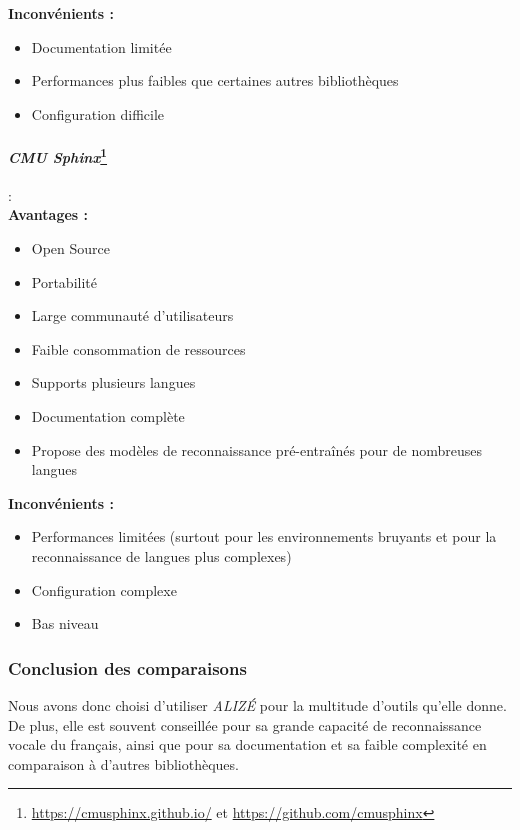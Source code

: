 \textbf{Inconvénients :}
\begin{itemize}
    \item Documentation limitée
    \item Performances plus faibles que certaines autres bibliothèques
    \item Configuration difficile
\end{itemize}

\paragraph*{\textbf{\textit{CMU Sphinx}}\footnote{\url{https://cmusphinx.github.io/} et \url{https://github.com/cmusphinx}}}: \\

\textbf{Avantages :}
\begin{itemize}
    \item Open Source
    \item Portabilité
    \item Large communauté d'utilisateurs
    \item Faible consommation de ressources
    \item Supports plusieurs langues
    \item Documentation complète
    \item Propose des modèles de reconnaissance pré-entraînés pour de nombreuses langues
\end{itemize}

\textbf{Inconvénients :}
\begin{itemize}
    \item Performances limitées (surtout pour les environnements bruyants et pour la reconnaissance de langues plus complexes)
    \item Configuration complexe
    \item Bas niveau
\end{itemize}



\subsubsection*{Conclusion des comparaisons}

Nous avons donc choisi d'utiliser \textit{ALIZÉ} pour la multitude d'outils qu'elle donne. De plus, elle est souvent conseillée pour sa grande capacité de reconnaissance vocale
du français, ainsi que pour sa documentation et sa faible complexité en comparaison à d'autres bibliothèques.

